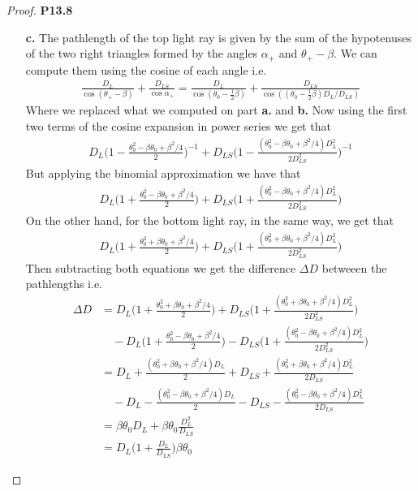 \documentclass[11pt]{article}
\theoremstyle{definition}
\begin{document}
\begin{proof}{\textbf{P13.8}}
\begin{itemize}
\cleardoublepage
\item [\textbf{c.}] The pathlength of the top light ray is given by the
sum of the hypotenuses of the two right triangles formed by the angles
$\alpha_+$ and $\theta_+ - \beta$. We can compute them using the cosine
of each angle i.e.
\begin{align*}
    \frac{D_{L}}{\cos(\theta_+ - \beta)} + \frac{D_{LS}}{\cos \alpha_+}
    = \frac{D_{L}}{\cos(\theta_0 - \frac{1}{2}\beta)}
    + \frac{D_{LS}}{\cos ((\theta_0 - \frac{1}{2}\beta) D_L/D_{LS})}
\end{align*}
Where we replaced what we computed on part \textbf{a.} and \textbf{b.}
Now using the first two terms of the cosine expansion in power series we get
that
\begin{align*}
    D_L\bigg(1 - \frac{\theta_0^2 - \beta\theta_0 + \beta^2/4}{2}\bigg)^{-1}
    + D_{LS}\bigg(1 - \frac{(\theta_0^2 - \beta\theta_0 + \beta^2/4)D_L^2}{2D_{LS}^2}\bigg)^{-1}
\end{align*}
But applying the binomial approximation we have that
\begin{align*}
    D_L\bigg(1 + \frac{\theta_0^2 - \beta\theta_0 + \beta^2/4}{2}\bigg)
    + D_{LS}\bigg(1 + \frac{(\theta_0^2 - \beta\theta_0 + \beta^2/4)D_L^2}{2D_{LS}^2}\bigg)
\end{align*}
On the other hand, for the bottom light ray, in the same way, we get that
\begin{align*}
    D_L\bigg(1 + \frac{\theta_0^2 + \beta\theta_0 + \beta^2/4}{2}\bigg)
    + D_{LS}\bigg(1 + \frac{(\theta_0^2 + \beta\theta_0 + \beta^2/4)D_L^2}{2D_{LS}^2}\bigg)
\end{align*}
Then subtracting both equations we get the difference $\Delta D$ betweeen
the pathlengths i.e.
\begin{align*}
    \Delta D  &= D_L\bigg(1 + \frac{\theta_0^2 + \beta\theta_0 + \beta^2/4}{2}\bigg)
    + D_{LS}\bigg(1 + \frac{(\theta_0^2 + \beta\theta_0 + \beta^2/4)D_L^2}{2D_{LS}^2}\bigg)\\
    &\quad- D_L\bigg(1 + \frac{\theta_0^2 - \beta\theta_0 + \beta^2/4}{2}\bigg)
    - D_{LS}\bigg(1 + \frac{(\theta_0^2 - \beta\theta_0 + \beta^2/4)D_L^2}{2D_{LS}^2}\bigg)\\
    &= D_L + \frac{(\theta_0^2 + \beta\theta_0 + \beta^2/4)D_L}{2}
    + D_{LS} + \frac{(\theta_0^2 + \beta\theta_0 + \beta^2/4)D_L^2}{2D_{LS}}\\
    &\quad - D_L - \frac{(\theta_0^2 - \beta\theta_0 + \beta^2/4)D_L}{2}
    - D_{LS} - \frac{(\theta_0^2 - \beta\theta_0 + \beta^2/4)D_L^2}{2D_{LS}}\\
    &= \beta\theta_0D_L +\beta\theta_0\frac{D_L^2}{D_{LS}}\\
    &= D_L\bigg(1 + \frac{D_L}{D_{LS}}\bigg)\beta\theta_0
\end{align*}


\end{itemize}
\end{proof}
\end{document}
